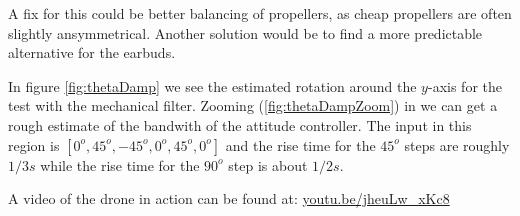 A fix for this could be better balancing of propellers, as cheap propellers are
often slightly ansymmetrical. Another solution would be to find a more
predictable alternative for the earbuds.

In figure \ref{fig:thetaDamp} we see the estimated rotation around the
$y$-axis for the test with the mechanical filter. Zooming
(\ref{fig:thetaDampZoom}) in we can get a rough estimate of the bandwith of the
attitude controller. The input in this region is $[0^o, 45^o, -45^o, 0^o, 45^o,
0^o]$ and the rise time for the $45^o$ steps are roughly $1/3 s$ while the rise
time for the $90^o$ step is about $1/2 s$.



A video of the drone in action can be found at: \url{youtu.be/jheuLw_xKc8}




%
%






